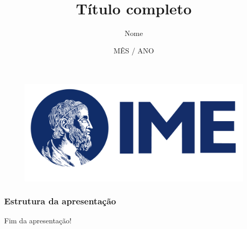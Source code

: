 \documentclass[
    11pt,               %
]{beamer}
\title[Título]{Título completo}          %
\author[Nome abreviado]{Nome}            %
\institute[IME-USP]{Instituto de Matemática e Estatística \\ (IME-USP)}
\date[Ano]{MÊS / ANO}
\begin{document}
\begin{frame}
    \begin{figure}
        \includegraphics[width=0.45\linewidth]{img/logo_IME.png}
    \end{figure}
    \titlepage
\end{frame}

\begin{frame}
    \frametitle{Estrutura da apresentação}
    \tableofcontents
\end{frame}







\begin{frame}
    \begin{center}
        {\Huge Fim da apresentação!}
    \end{center}
\end{frame}
\end{document}
